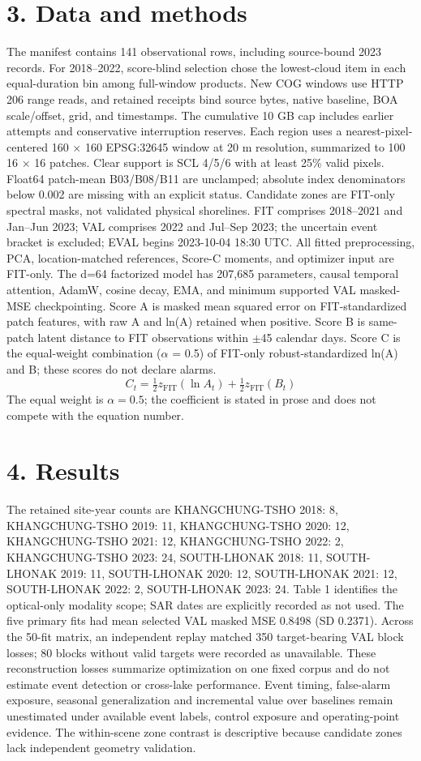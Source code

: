 \documentclass[9pt,twocolumn]{article}
\begin{document}
\section*{3. Data and methods}
The manifest contains 141 observational rows, including source-bound 2023 records. For 2018--2022, score-blind selection chose the lowest-cloud item in each equal-duration bin among full-window products. New COG windows use HTTP 206 range reads, and retained receipts bind source bytes, native baseline, BOA scale/offset, grid, and timestamps. The cumulative 10 GB cap includes earlier attempts and conservative interruption reserves.
Each region uses a nearest-pixel-centered 160 $\times$ 160 EPSG:32645 window at 20 m resolution, summarized to 100 16 $\times$ 16 patches. Clear support is SCL 4/5/6 with at least 25\% valid pixels. Float64 patch-mean B03/B08/B11 are unclamped; absolute index denominators below 0.002 are missing with an explicit status. Candidate zones are FIT-only spectral masks, not validated physical shorelines.
FIT comprises 2018--2021 and Jan--Jun 2023; VAL comprises 2022 and Jul--Sep 2023; the uncertain event bracket is excluded; EVAL begins 2023-10-04 18:30 UTC. All fitted preprocessing, PCA, location-matched references, Score-C moments, and optimizer input are FIT-only. The d=64 factorized model has 207,685 parameters, causal temporal attention, AdamW, cosine decay, EMA, and minimum supported VAL masked-MSE checkpointing.
Score A is masked mean squared error on FIT-standardized patch features, with raw A and ln(A) retained when positive. Score B is same-patch latent distance to FIT observations within $\pm$45 calendar days. Score C is the equal-weight combination ($\alpha$ = 0.5) of FIT-only robust-standardized ln(A) and B; these scores do not declare alarms.
\begin{equation}C_t=\tfrac{1}{2}z_{\mathrm{FIT}}(\ln A_t)+\tfrac{1}{2}z_{\mathrm{FIT}}(B_t)\tag{5}\end{equation}
\noindent The equal weight is $\alpha=0.5$; the coefficient is stated in prose and does not compete with the equation number.
\section*{4. Results}
The retained site-year counts are KHANGCHUNG-TSHO 2018: 8, KHANGCHUNG-TSHO 2019: 11, KHANGCHUNG-TSHO 2020: 12, KHANGCHUNG-TSHO 2021: 12, KHANGCHUNG-TSHO 2022: 2, KHANGCHUNG-TSHO 2023: 24, SOUTH-LHONAK 2018: 11, SOUTH-LHONAK 2019: 11, SOUTH-LHONAK 2020: 12, SOUTH-LHONAK 2021: 12, SOUTH-LHONAK 2022: 2, SOUTH-LHONAK 2023: 24. Table 1 identifies the optical-only modality scope; SAR dates are explicitly recorded as not used.
The five primary fits had mean selected VAL masked MSE 0.8498 (SD 0.2371). Across the 50-fit matrix, an independent replay matched 350 target-bearing VAL block losses; 80 blocks without valid targets were recorded as unavailable. These reconstruction losses summarize optimization on one fixed corpus and do not estimate event detection or cross-lake performance.
Event timing, false-alarm exposure, seasonal generalization and incremental value over baselines remain unestimated under available event labels, control exposure and operating-point evidence. The within-scene zone contrast is descriptive because candidate zones lack independent geometry validation.
\end{document}
